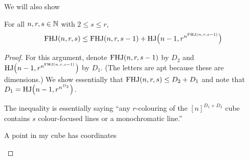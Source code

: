 We will also show
\begin{boxlemma} \label{Ch6:Lemma:FHJ_Recursion}
    For all $n, r, s \in \mathbb{N}$ with $2 \leq s \leq r$,
    \begin{align*}
        \operatorname{FHJ}(n, r, s) \le \operatorname{FHJ}(n, r, s - 1) + \operatorname{HJ}\!\left( n - 1, r^{n^{\operatorname{FHJ}(n, r, s - 1)}} \right)
    \end{align*}
\end{boxlemma}
\begin{proof}
For this argument, denote $\operatorname{FHJ}(n, r, s - 1)$ by $D_2$ and $\operatorname{HJ}\!\left( n - 1, r^{n^{\operatorname{FHJ}(n, r, s - 1)}} \right)$ by $D_1$. (The letters are apt because these are dimensions.) We show essentially that $\operatorname{FHJ}(n, r, s) \le D_2 + D_1$ and note that $D_1 = \operatorname{HJ}\!\left( n - 1, r^{n^{D_2}} \right)$.

The inequality is essentially saying ``any $r$-colouring of the $[n]^{D_1 + D_2}$ cube contains $s$ colour-focused lines or a monochromatic line.''

A point in my cube has coordinates

\begin{figure}[H]
    \centering
\end{figure}


\end{proof}
